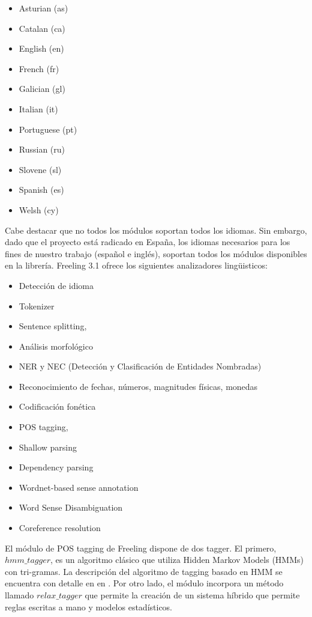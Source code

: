 \begin{itemize}
\item Asturian (as)
\item Catalan (ca)
\item English (en)
\item French (fr)
\item Galician (gl)
\item Italian (it)
\item Portuguese (pt)
\item Russian (ru)
\item Slovene (sl)
\item Spanish (es)
\item Welsh (cy)
\end{itemize}

Cabe destacar que no todos los m\'odulos soportan todos los idiomas. Sin embargo, dado que el proyecto está radicado en Espa\~na,
los idiomas necesarios para los fines de nuestro trabajo (espa\~nol e inglés), soportan todos los m\'odulos disponibles
en la librería.
Freeling 3.1 ofrece los siguientes analizadores lingüisticos:

\begin{itemize}
\item Detecci\'on de idioma
\item Tokenizer
\item Sentence splitting,
\item Análisis morfol\'ogico
\item NER y NEC (Detecci\'on y Clasificaci\'on de Entidades Nombradas)
\item Reconocimiento de fechas, números, magnitudes físicas, monedas
\item Codificaci\'on fonética
\item POS tagging,
\item Shallow parsing
\item Dependency parsing
\item Wordnet-based sense annotation
\item Word Sense Disambiguation
\item Coreference resolution
\end{itemize}


El módulo de POS tagging de Freeling dispone de dos tagger. El primero, $hmm\_tagger$, es un algoritmo clásico que utiliza Hidden Markov Models (HMMs) con tri-gramas. La descripción del algoritmo de tagging basado en HMM se encuentra con detalle en  en \cite{POS0}. Por otro lado, el módulo incorpora un método llamado $relax\_tagger$ que permite la creación de un sistema híbrido que permite reglas escritas a mano y modelos estadísticos.

